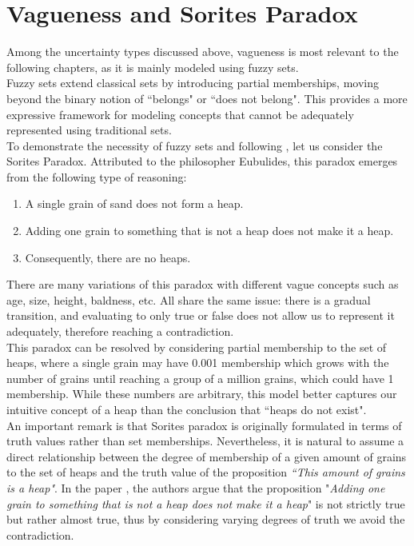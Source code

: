 \section{Vagueness and Sorites Paradox}
\label{sec:sorites}

Among the uncertainty types discussed above, vagueness is most relevant to the following chapters, as it is mainly modeled using fuzzy sets.\\

Fuzzy sets extend classical sets by introducing partial memberships, moving beyond the binary notion of ``belongs" or ``does not belong". This provides a more expressive framework for modeling concepts that cannot be adequately represented using traditional sets.\\

To demonstrate the necessity of fuzzy sets and following \cite{HájekSorites}, let us consider the Sorites Paradox. Attributed to the philosopher Eubulides, this paradox emerges from the following type of reasoning:

\begin{enumerate}
    \item A single grain of sand does not form a heap.
    \item Adding one grain to something that is not a heap does not make it a heap.
    \item Consequently, there are no heaps.
\end{enumerate}


There are many variations of this paradox with different vague concepts such as age, size, height, baldness, etc. All share the same issue: there is a gradual transition, and evaluating to only true or false does not allow us to represent it adequately, therefore reaching a contradiction.\\

This paradox can be resolved by considering partial membership to the set of heaps, where a single grain may have 0.001 membership which grows with the number of grains until reaching a group of a million grains, which could have 1 membership. While these numbers are arbitrary, this model better captures our intuitive concept of a heap than the conclusion that ``heaps do not exist".\\

An important remark is that Sorites paradox is originally formulated in terms of truth values rather than set memberships. Nevertheless, it is natural to assume a direct relationship between the degree of membership of a given amount of grains to the set of heaps and the truth value of the proposition \textit{``This amount of grains is a heap"}. In the paper \cite{HájekSorites}, the authors argue that the proposition "\textit{Adding one grain to something that is not a heap does not make it a heap}" is not strictly true but rather almost true, thus by considering varying degrees of truth we avoid the contradiction.\\

